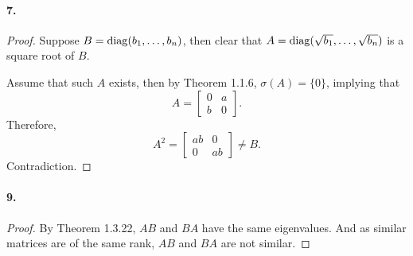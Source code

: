   \paragraph{7.}
  \begin{proof}
    Suppose $B=\operatorname{diag}(b_1,\dots,b_n)$, then clear that $A=\operatorname{diag}(\sqrt{b_1},\dots,
    \sqrt{b_n})$ is a square root of $B$.\par
    Assume that such $A$ exists, then by Theorem 1.1.6, $\sigma(A)=\{0\}$, 
    implying that 
    \[
      A = \begin{bmatrix}
        0 & a \\ b & 0        
      \end{bmatrix}.
    \]
    Therefore,
    \[
      A^2 = \begin{bmatrix}
        ab & 0 \\ 0 & ab
      \end{bmatrix} \ne B.
    \]
    Contradiction.
  \end{proof}

  \paragraph{9.}
  \begin{proof}
    By Theorem 1.3.22, $AB$ and $BA$ have the same eigenvalues. And as similar
    matrices are of the same rank, $AB$ and $BA$ are not similar.
  \end{proof}

